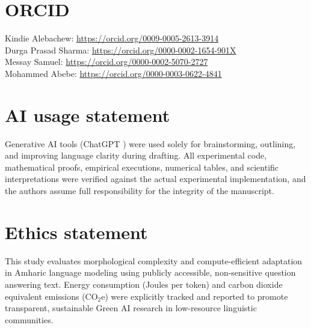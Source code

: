 \documentclass{interact}
\begin{document}
\section*{ORCID}
\noindent Kindie Alebachew: \url{https://orcid.org/0009-0005-2613-3914}\\
Durga Prasad Sharma: \url{https://orcid.org/0000-0002-1654-901X}\\
Messay Samuel: \url{https://orcid.org/0000-0002-5070-2727}\\
Mohammed Abebe: \url{https://orcid.org/0000-0003-0622-4841}

\section*{AI usage statement}
Generative AI tools (ChatGPT \cite{ref65}) were used solely for brainstorming, outlining, and improving language clarity during drafting. All experimental code, mathematical proofs, empirical executions, numerical tables, and scientific interpretations were verified against the actual experimental implementation, and the authors assume full responsibility for the integrity of the manuscript.

\section*{Ethics statement}
This study evaluates morphological complexity and compute-efficient adaptation in Amharic language modeling using publicly accessible, non-sensitive question answering text. Energy consumption (Joules per token) and carbon dioxide equivalent emissions ($\text{CO}_2\text{e}$) were explicitly tracked and reported to promote transparent, sustainable Green AI research in low-resource linguistic communities.

\printbibliography
\end{document}

